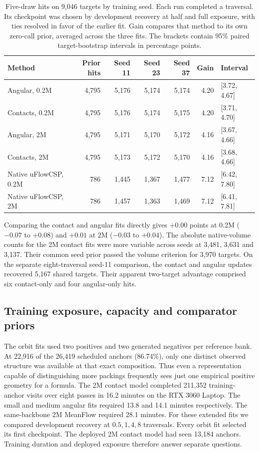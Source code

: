 \begin{table}[tbp]\centering\small\setlength{\tabcolsep}{4pt}
\caption{Five-draw hits on 9,046 targets by training seed. Each run completed a traversal. Its checkpoint was chosen by development recovery at half and full exposure, with ties resolved in favor of the earlier fit. Gain compares that method to its own zero-call prior, averaged across the three fits. The brackets contain 95\% paired target-bootstrap intervals in percentage points.}\label{tab:e-repeat}
\begin{tabular}{lrrrrrl}\hline
Method & Prior hits & Seed 11 & Seed 23 & Seed 37 & Gain & Interval\\\hline
Angular, 0.2M & 4,795 & 5,176 & 5,174 & 5,174 & 4.20 & [3.72, 4.67]\\
Contacts, 0.2M & 4,795 & 5,176 & 5,174 & 5,175 & 4.20 & [3.71, 4.70]\\
Angular, 2M & 4,795 & 5,171 & 5,170 & 5,172 & 4.16 & [3.67, 4.66]\\
Contacts, 2M & 4,795 & 5,173 & 5,172 & 5,170 & 4.16 & [3.68, 4.66]\\
Native uFlowCSP, 0.2M & 786 & 1,445 & 1,367 & 1,477 & 7.12 & [6.42, 7.80]\\
Native uFlowCSP, 2M & 786 & 1,457 & 1,363 & 1,469 & 7.12 & [6.41, 7.81]\\\hline
\end{tabular}
\end{table}

Comparing the contact and angular fits directly gives $+0.00$ points at 0.2M ($-0.07$ to $+0.08$) and $+0.01$ at 2M ($-0.03$ to $+0.04$). The absolute native-volume counts for the 2M contact fits were more variable across seeds at 3,481, 3,631 and 3,137. Their common seed prior passed the volume criterion for 3,970 targets. On the separate eight-traversal seed-11 comparison, the contact and angular updates recovered 5,167 shared targets. Their apparent two-target advantage comprised six contact-only and four angular-only hits.

\subsection{Training exposure, capacity and comparator priors}

The orbit fits used two positives and two generated negatives per reference bank. At 22,916 of the 26,419 scheduled anchors (86.74\%), only one distinct observed structure was available at that exact composition. Thus even a representation capable of distinguishing more packings frequently sees just one empirical positive geometry for a formula. The 2M contact model completed 211,352 training-anchor visits over eight passes in 16.2 minutes on the RTX 3060 Laptop. The small and medium angular fits required 13.8 and 14.1 minutes respectively. The same-backbone 2M MeanFlow required 28.1 minutes. For these extended fits we compared development recovery at $0.5,1,4,8$ traversals. Every orbit fit selected its first checkpoint. The deployed 2M contact model had seen 13,184 anchors. Training duration and deployed exposure therefore answer separate questions.


